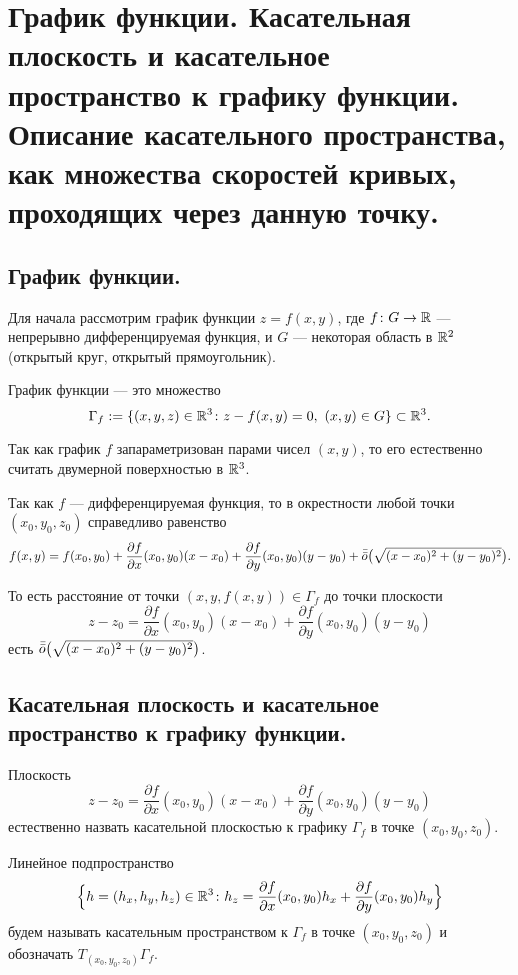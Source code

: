 \documentclass[a4paper]{article}
\theoremstyle{named}
\begin{document}
    \section{График функции. Касательная плоскость и касательное пространство к графику функции. Описание касательного пространства, как множества скоростей кривых, проходящих через данную точку.} 
    
    \subsection{График функции.}

    Для начала рассмотрим график функции $z=f(x,y)$, где $f\colon G\to \mathbb{R}$ --- непрерывно дифференцируемая функция, и $G$ --- некоторая область в $\mathbb{R}^2$ (открытый круг, открытый прямоугольник).
    
    График функции --- это множество 
    $$\Gamma_f:=\{(x,y,z)\in \RR^3\colon z-f(x,y)=0,\ (x,y)\in G\}\subset \RR^3.$$
    
    Так как график $f$ запараметризован парами чисел $(x,y)$, то его естественно считать двумерной поверхностью в $\mathbb{R}^3$.
    
    Так как $f$ --- дифференцируемая функция, то в окрестности любой точки $(x_0, y_0, z_0)$ справедливо равенство 
    $$
        f(x,y)=f(x_0,y_0) +	\frac{\partial f}{\partial x}(x_0,y_0)(x-x_0)+\frac{\partial f}{\partial y}(x_0,y_0)(y-y_0)	+ \bar{\bar{o}}\bigl(\sqrt{(x-x_0)^2+(y-y_0)^2}\bigr).
    $$
    
    То есть расстояние от точки $(x,y,f(x,y))\in \Gamma_f$ до точки плоскости
    $$
        z-z_0=\frac{\partial f}{\partial x}(x_0,y_0)(x-x_0)	+\frac{\partial f}{\partial y}(x_0,y_0)(y-y_0)
    $$
    есть $\bar{\bar{o}}\bigl(\sqrt{(x-x_0)^2+(y-y_0)^2}\bigr)$.
    
    \subsection{ Касательная плоскость и касательное пространство к графику функции.}
    
    Плоскость
    $$
        z-z_0=\frac{\partial f}{\partial x}(x_0,y_0)(x-x_0)	+\frac{\partial f}{\partial y}(x_0,y_0)(y-y_0)
    $$
    естественно назвать касательной плоскостью к графику $\Gamma_f$ в точке $(x_0,y_0, z_0)$.
    
    Линейное подпространство
    $$
        \Bigl\{h=(h_x, h_y, h_z)\in \mathbb{R}^3\colon h_z=\frac{\partial f}{\partial x}(x_0,y_0)h_x+\frac{\partial f}{\partial y}(x_0,y_0)h_y\Bigr\}
    $$
    будем называть касательным пространством к $\Gamma_f$ в точке $(x_0, y_0, z_0)$ и обозначать $T_{(x_0,y_0,z_0)}\Gamma_f$.
    
\end{document}

